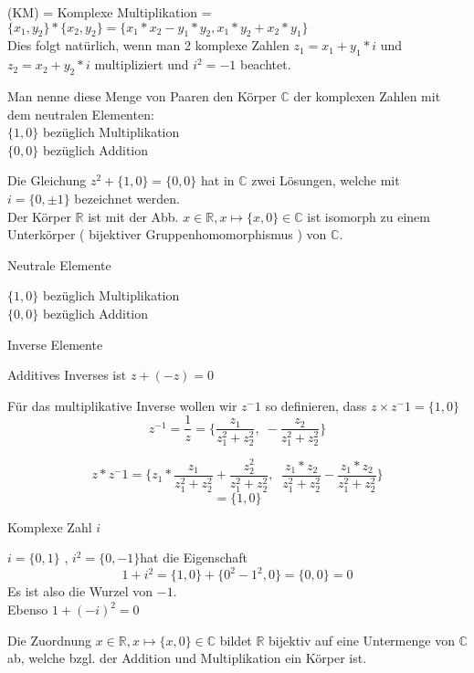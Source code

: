 \documentclass[headsepline,12pt,a4paper]{scrartcl}
\begin{document}
(KM) = Komplexe Multiplikation = $\{x_1,y_2\} * \{x_2,y_2\} = \{x_1 * x_2 - y_1*y_2 , x_1 *y_2 + x_2 * y_1\} $ \\ 
Dies folgt natürlich, wenn man 2 komplexe Zahlen $z_1 = x_1 + y_1 * i $ und $z_2 = x_2 + y_2 * i  $ multipliziert und $i^2= -1$ beachtet. \\

\item Man nenne diese Menge von Paaren den Körper $\mathbb{C}$ der komplexen Zahlen mit dem neutralen Elementen: \\
$\{1,0\}$ bezüglich Multiplikation\\
$\{0,0\}$ bezüglich Addition \\

\item Die Gleichung $ z^2 + \{1,0\} = \{0,0\} $ hat in $\mathbb{C}$ zwei Lösungen, welche mit \\
$i=\{0,\pm 1\} $ bezeichnet werden. \\
Der Körper $\mathbb{R}$ ist mit der Abb. $x \in \mathbb{R}, x \mapsto \{x,0\} \in \mathbb{C} $ ist isomorph 
zu einem Unterkörper ( bijektiver Gruppenhomomorphismus ) von $\mathbb{C}$. \\

\begin{center}
\item[Neutrale Elemente]
\end{center}
\item 
$\{1,0\}$ bezüglich Multiplikation\\
$\{0,0\}$ bezüglich Addition \\

\begin{center}
\item[Inverse Elemente]
\end{center}
\item Additives Inverses ist $ z + (-z) = 0$ \\
\item Für das multiplikative Inverse wollen wir $z^-1 $ so definieren, dass $z \times z^-1 = \{1,0\} $ \\

$$ z^{-1} = \frac{1}{z} = \{\frac{z_1}{z^2_1 + z^2_2} , \;  - \frac{z_2}{z^2_1 + z^2_2}\} $$

$$ z * z^-1 = \{z_1 * \frac{z_1}{z^2_1+z^2_2} + \frac{z^2_2}{z^2_1+z^2_2}, \; \; \frac{z_1*z_2}{z^2_1+z^2_2} - \frac{z_1*z_2}{z^2_1+z^2_2}\} 
$$ 
$$ = \{1,0\} $$

\begin{center}
\item[Komplexe Zahl $i$]
\end{center}
\item $ i = \{0,1\} $ , $ i^2 = \{0,-1\} $hat die Eigenschaft \\
$$ 1+i^2 = \{1,0\} + \{0^2-1^2,0 \} = \{0,0\} = 0 $$ Es ist also die Wurzel von $-1$. \\
Ebenso $ 1+(-i)^2 = 0 $\\
\item Die Zuordnung  $x \in \mathbb{R}, x \mapsto \{x,0\} \in \mathbb{C} $ bildet $\mathbb{R}$ bijektiv auf eine Untermenge von $\mathbb{C}$ ab, welche bzgl. der Addition und Multiplikation ein Körper ist.
\end{document}
